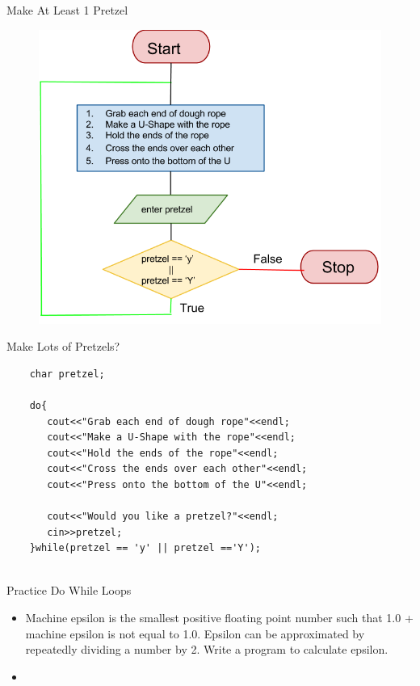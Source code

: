 \documentclass[xcolor={dvipsnames}]{beamer}
\begin{document}
\begin{frame}{Make At Least 1 Pretzel}
	\begin{figure}
		\includegraphics[width=.8\textwidth]{do_while_pretzels}
	\end{figure}
\end{frame}

%
\begin{frame}[fragile]{Make Lots of  Pretzels?}
\begin{verbatim}
    char pretzel;

    do{     
       cout<<"Grab each end of dough rope"<<endl;
       cout<<"Make a U-Shape with the rope"<<endl;
       cout<<"Hold the ends of the rope"<<endl;
       cout<<"Cross the ends over each other"<<endl;
       cout<<"Press onto the bottom of the U"<<endl;

       cout<<"Would you like a pretzel?"<<endl;
       cin>>pretzel;
    }while(pretzel == 'y' || pretzel =='Y');
 
\end{verbatim}
\end{frame}

\begin{frame}{Practice Do While Loops}
\begin{itemize}
	\item Machine epsilon is the smallest positive floating point number such that 1.0 + machine epsilon is not equal to 1.0. Epsilon can be approximated by repeatedly dividing a number by 2. Write a program to calculate epsilon. 
	\item
\end{itemize}
\end{frame}
\end{document}
